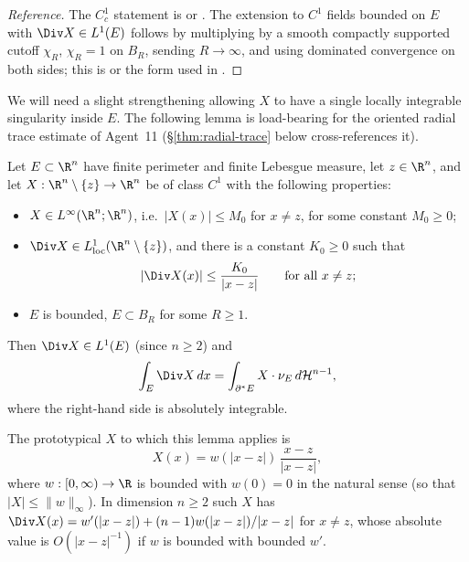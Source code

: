 \begin{proof}[Reference]
The $C^1_c$ statement is \cite[Thm.~15.5]{Maggi2012} or
\cite[Thm.~3.36]{AFP2000}.  The extension to $C^1$ fields bounded on
$E$ with $\Div X\in L^1(E)$ follows by multiplying by a smooth
compactly supported cutoff $\chi_R$, $\chi_R=1$ on $B_R$, sending
$R\to\infty$, and using dominated convergence on both sides; this is
\cite[Thm.~16.3]{Maggi2012} or the form used in
\cite[Ch.~17]{Maggi2012}.
\end{proof}

We will need a slight strengthening allowing $X$ to have a single
locally integrable singularity inside $E$.  The following lemma
is load-bearing for the oriented radial trace estimate of
Agent~11 (\S\ref{thm:radial-trace} below cross-references it).

\begin{lemma}\label{lem:truncation}
Let $E\subset\R^n$ have finite perimeter and finite Lebesgue measure,
let $z\in\R^n$, and let $X:\R^n\setminus\{z\}\to\R^n$ be of class
$C^1$ with the following properties:
\begin{itemize}
   \item[(a)] $X\in L^\infty(\R^n;\R^n)$, i.e.\ $|X(x)|\le M_0$ for
       $x\ne z$, for some constant $M_0\ge0$;
   \item[(b)] $\Div X\in L^1_{\rm loc}(\R^n\setminus\{z\})$, and
       there is a constant $K_0\ge0$ such that
       \[
          |\Div X(x)|\le \frac{K_0}{|x-z|}
          \qquad\text{for all }x\ne z;
       \]
   \item[(c)] $E$ is bounded, $E\subset B_R$ for some $R\ge1$.
\end{itemize}
Then $\Div X\in L^1(E)$ (since $n\ge2$) and
\begin{equation}\label{eq:trunc-flux}
   \int_E\Div X\,dx
   =\int_{\partial^*E}X\cdot\nu_E\,d\mathcal H^{n-1},
\end{equation}
where the right-hand side is absolutely integrable.

The prototypical $X$ to which this lemma applies is
\[
   X(x)
   =w(|x-z|)\,\frac{x-z}{|x-z|},
\]
where $w:[0,\infty)\to\R$ is bounded with $w(0)=0$ in the natural
sense (so that $|X|\le\|w\|_\infty$).  In dimension $n\ge2$ such $X$
has $\Div X(x)=w'(|x-z|)+(n-1)w(|x-z|)/|x-z|$ for $x\ne z$, whose
absolute value is $O(|x-z|^{-1})$ if $w$ is bounded with bounded
$w'$.
\end{lemma}

